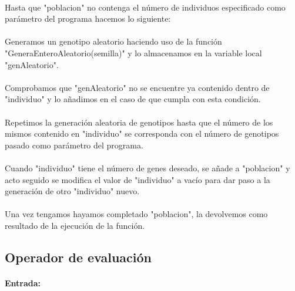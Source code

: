 	\paragraph{}Hasta que "poblacion" no contenga el número de individuos especificado como parámetro del programa hacemos lo siguiente:
	
	\paragraph{}Generamos un genotipo aleatorio haciendo uso de la función "GeneraEnteroAleatorio(semilla)" y lo almacenamos en la variable local "genAleatorio".
	
	\paragraph{}Comprobamos que "genAleatorio" no se encuentre ya contenido dentro de "individuo" y lo añadimos en el caso de que cumpla con esta condición.
	
	\paragraph{}Repetimos la generación aleatoria de genotipos hasta que el número de los mismos contenido en "individuo" se corresponda con el número de genotipos pasado como parámetro del programa.
	
	\paragraph{}Cuando "individuo" tiene el número de genes deseado, se añade a "poblacion" y acto seguido se modifica el valor de "individuo" a vacío para dar paso a la generación de otro "individuo" nuevo.
	
	\paragraph{}Una vez tengamos hayamos completado "poblacion", la devolvemos como resultado de la ejecución de la función.

	\subsection{Operador de evaluación}
	
	\paragraph{Entrada:}
	
